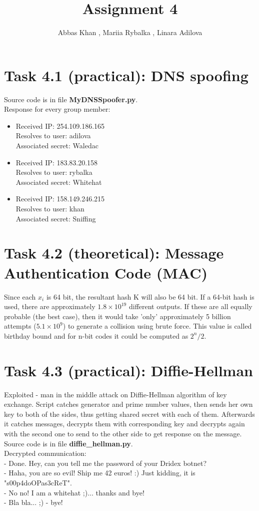 \documentclass{article}
\title{Assignment 4}
\author{Abbas Khan , Mariia Rybalka , Linara Adilova}
\begin{document}
\maketitle 
    
\section*{Task 4.1 (practical): DNS spoofing}
Source code is in file \textbf{MyDNSSpoofer.py}.
\\
Response for every group member:
\begin{itemize}
\item
Received IP: 254.109.186.165
\\Resolves to user: adilova
\\Associated secret: Waledac
\item 
Received IP: 183.83.20.158
\\Resolves to user: rybalka
\\Associated secret: Whitehat
\item
Received IP: 158.149.246.215
\\Resolves to user: khan
\\Associated secret: Sniffing
\end{itemize}

\section*{Task 4.2 (theoretical): Message Authentication Code (MAC)}
Since each $x_{i}$ is 64 bit, the resultant hash K will also be 64 bit. If a 64-bit hash is used, there are approximately $1.8 \times 10^{19}$ different outputs. If these are all equally probable (the best case), then it would take 'only' approximately 5 billion attempts ($5.1 \times 10^{9}$) to generate a collision using brute force. This value is called birthday bound and for n-bit codes it could be computed as $2^{n}/2$. \cite{birthday_attack}

\section*{Task 4.3 (practical): Diffie-Hellman}
Exploited - man in the middle attack on Diffie-Hellman algorithm of key exchange. Script catches generator and prime number values, then sends her own key to both of the sides, thus getting shared secret with each of them. Afterwards it catches messages, decrypts them with corresponding key and decrypts again with the second one to send to the other side to get response on the message.
\\
Source code is in file \textbf{diffie\_hellman.py}.
\\
Decrypted communication:
\\- Done. Hey, can you tell me the password of your Dridex botnet?
\\- Haha, you are so evil! Ship me 42 euros! :) Just kidding, it is "s00p4doOPas3cReT".
\\- No no! I am a whitehat ;)... thanks and bye!
\\- Bla bla... ;) - bye!
\end{document}
